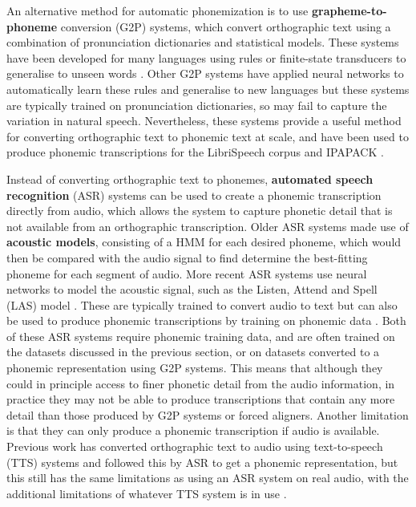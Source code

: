 An alternative method for automatic phonemization is to use \textbf{grapheme-to-phoneme} conversion (G2P) systems, which convert orthographic text using a combination of pronunciation dictionaries and statistical models. These systems have been developed for many languages using rules or finite-state transducers to generalise to unseen words \citep{Mortensen-et-al:2018, johnson2020g2p, Bernard2021}. Other G2P systems have applied neural networks to automatically learn these rules and generalise to new languages \citep{NOVAK_MINEMATSU_HIROSE_2016, Zhu2022} but these systems are typically trained on pronunciation dictionaries, so may fail to capture the variation in natural speech. Nevertheless, these systems provide a useful method for converting orthographic text to phonemic text at scale, and have been used to produce phonemic transcriptions for the LibriSpeech corpus \citep{Kahn_2020} and IPAPACK \citep{zhu-etal-2024-taste}.

Instead of converting orthographic text to phonemes, \textbf{automated speech recognition} (ASR) systems can be used to create a phonemic transcription directly from audio, which allows the system to capture phonetic detail that is not available from an orthographic transcription. Older ASR systems made use of \textbf{acoustic models}, consisting of a HMM for each desired phoneme, which would then be compared with the audio signal to find determine the best-fitting phoneme for each segment of audio. More recent ASR systems use neural networks to model the acoustic signal, such as the Listen, Attend and Spell (LAS) model \citep{chan2015listen}. These are typically trained to convert audio to text but can also be used to produce phonemic transcriptions by training on phonemic data \citep{feng-2023-language-universal-phonetic}. Both of these ASR systems require phonemic training data, and are often trained on the datasets discussed in the previous section, or on datasets converted to a phonemic representation using G2P systems. This means that although they could in principle access to finer phonetic detail from the audio information, in practice they may not be able to produce transcriptions that contain any more detail than those produced by G2P systems or forced aligners. Another limitation is that they can only produce a phonemic transcription if audio is available. Previous work has converted orthographic text to audio using text-to-speech (TTS) systems and followed this by ASR to get a phonemic representation, but this still has the same limitations as using an ASR system on real audio, with the additional limitations of whatever TTS system is in use .  

